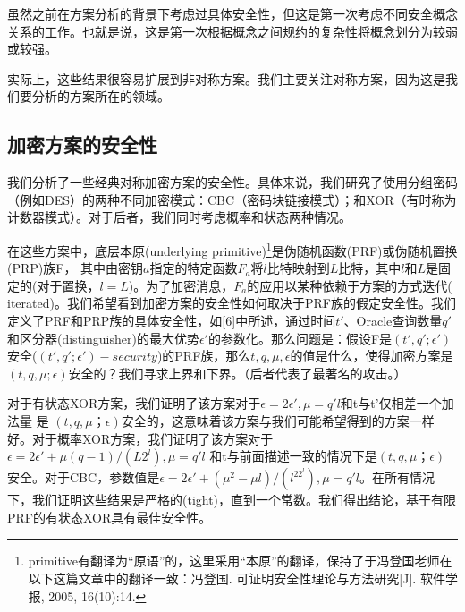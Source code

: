 \documentclass[]{article}
\begin{document}
虽然之前在方案分析的背景下考虑过具体安全性，但这是第一次考虑不同安全概念关系的工作。也就是说，这是第一次根据概念之间规约的复杂性将概念划分为较弱或较强。\par

实际上，这些结果很容易扩展到非对称方案。我们主要关注对称方案，因为这是我们要分析的方案所在的领域。

\subsection{加密方案的安全性}

我们分析了一些经典对称加密方案的安全性。具体来说，我们研究了使用分组密码（例如DES）的两种不同加密模式：CBC（密码块链接模式）；和XOR（有时称为计数器模式）。对于后者，我们同时考虑概率和状态两种情况。\par

在这些方案中，底层本原(underlying primitive)\footnote{primitive有翻译为“原语”的，这里采用“本原”的翻译，保持了于冯登国老师在以下这篇文章中的翻译一致：冯登国. 可证明安全性理论与方法研究[J]. 软件学报, 2005, 16(10):14.}是伪随机函数(PRF)或伪随机置换(PRP)族F，
其中由密钥$a$指定的特定函数$F_a$将$l$比特映射到$L$比特，其中$l$和$L$是固定的(对于置换，$l=L$)。为了加密消息，$F_a$的应用以某种依赖于方案的方式迭代( iterated)\footnotemark。我们希望看到加密方案的安全性如何取决于PRF族的假定安全性。我们定义了PRF和PRP族的具体安全性，如[6]中所述，通过时间$t'$、Oracle查询数量$q'$和区分器(distinguisher)的最大优势$\epsilon'$的参数化。那么问题是：假设F是$(t',q';\epsilon')$安全($(t',q';\epsilon')-security$)的PRF族，那么$t,q,\mu,\epsilon$的值是什么，使得加密方案是$(t,q,\mu;\epsilon)$安全的？我们寻求上界和下界。（后者代表了最著名的攻击。）

\par

对于有状态XOR方案，我们证明了该方案对于$\epsilon =2 \epsilon ',\mu =q'l$和t与t’仅相差一个加法量 是 $(t,q,\mu；\epsilon)$安全的，这意味着该方案与我们可能希望得到的方案一样好。对于概率XOR方案，我们证明了该方案对于$\epsilon =2 \epsilon '+\mu (q-1)/(L2^l),\mu =q'l$
和t与前面描述一致的情况下是$(t,q,\mu；\epsilon)$安全。对于CBC，参数值是$\epsilon=2\epsilon '+(\mu^2 - \mu l)/(l^22^l),\mu=q' l$。在所有情况下，我们证明这些结果是严格的(tight)，直到一个常数。我们得出结论，基于有限PRF的有状态XOR具有最佳安全性。
\par
\end{document}
